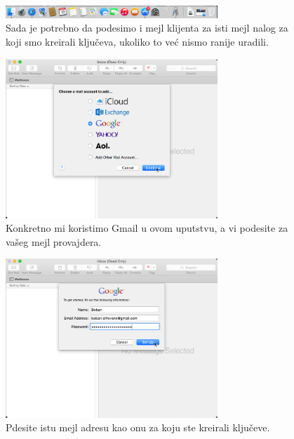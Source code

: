 \documentclass[a4paper,11pt]{article}
\begin{document}
\begin{figure}[!h]
	\begin{center}
		\includegraphics[width=8cm]{11_Oracle_VM_VirtualBox.png}
		\caption{Sada je potrebno da podesimo i mejl klijenta za isti mejl nalog za koji smo kreirali klju\v{c}eva, ukoliko to ve\'{c} nismo ranije uradili.}
		\label{gpgtools_email_setup1}
	\end{center}
\end{figure}
\begin{figure}[!h]
	\begin{center}
		\includegraphics[width=8cm]{12_Oracle_VM_VirtualBox.png}
		\caption{Konkretno mi koristimo Gmail u ovom uputstvu, a vi podesite za va\v{s}eg mejl provajdera. }
		\label{gpgtools_email_setup2}
	\end{center}
\end{figure}
\newpage
\begin{figure}[!h]
	\begin{center}
		\includegraphics[width=8cm]{13_Oracle_VM_VirtualBox.png}
		\caption{Pdesite istu mejl adresu kao onu za koju ste kreirali klju\v{c}eve.}
		\label{gpgtools_email_setup3}
	\end{center}
\end{figure}
\end{document}
